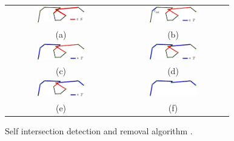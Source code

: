 \begin{figure}
 \begin{tabular}{cc}
  \includegraphics[width=0.45\textwidth]{./img/selfintersAlgo01}&
  \includegraphics[width=0.45\textwidth]{./img/selfintersAlgo02}\\
  (a)&(b)\\
  \includegraphics[width=0.45\textwidth]{./img/selfintersAlgo03}&
  \includegraphics[width=0.45\textwidth]{./img/selfintersAlgo04}\\
  (c)&(d)\\
  \includegraphics[width=0.45\textwidth]{./img/selfintersAlgo05}&
  \includegraphics[width=0.45\textwidth]{./img/selfintersAlgo06}\\
  (e)&(f)\\
 \end{tabular}
 \caption{Self intersection detection and removal algorithm \cite{zaharescu2007transformesh}.}
 \label{fig:selfintalgo}
\end{figure}

